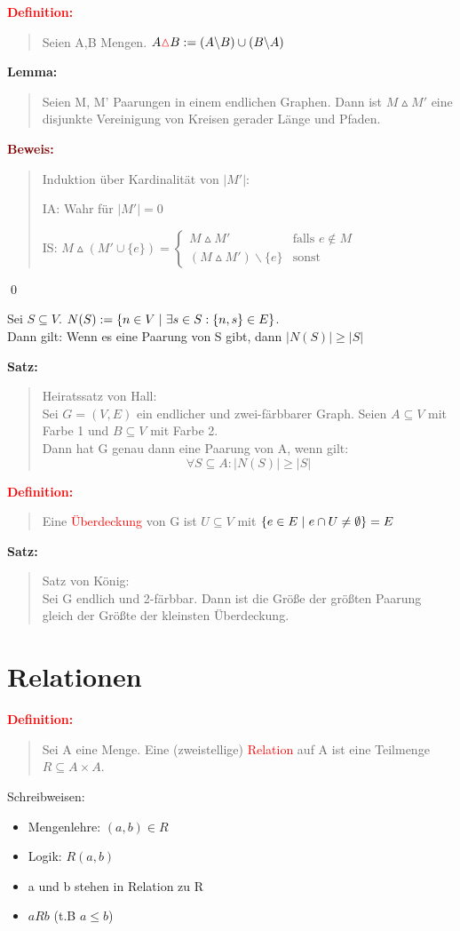 \documentclass{article}
\newcommand{\smsp}{\phantom{\hspace{3px}}}
\newcommand{\red}[1]{\textcolor{red}{#1}}
\newcommand{\dgr}[1]{\textcolor{dgr}{#1}}
\newcommand{\maroon}[1]{\textcolor{maroon}{#1}}
\newcommand{\de}[1]{\red{\textbf{Definition: }}\begin{quote}#1\end{quote}}
\newcommand{\se}[1]{\dgr{\textbf{Satz: }}\begin{quote}#1\end{quote}}
\newcommand{\lem}[1]{\dgr{\textbf{Lemma: }}\begin{quote}#1\end{quote}}
\newcommand{\pr}[1]{\maroon{\textbf{Beweis: }}\begin{quote}#1\end{quote}\qed}
\renewcommand{\st}{\smsp | \smsp}
\newcommand{\xor}{\mathbin{\vartriangle}}
\newcommand{\bs}{\backslash}
\begin{document}
\de{
    Seien A,B Mengen. $A \red{\xor} B := (A \bs B) \cup (B \bs A)$
}

\lem{
    Seien M, M' Paarungen in einem endlichen Graphen. Dann ist $M \xor M'$ eine disjunkte Vereinigung von Kreisen gerader Länge und Pfaden.
}
\pr{
    Induktion über Kardinalität von $|M'|$:

    IA: Wahr für $|M'| = 0$

    IS: $M \xor (M' \cup \{e\}) = \begin{cases}
        M \xor M' & \text{falls $e \notin M$}\\
        (M \xor M') \bs \{e\} & \text{sonst}
    \end{cases}$
}

Sei $S \subseteq V$. $N(S) := \{n \in V \st \exists s \in S: \{n,s\} \in E\}$.\\
Dann gilt: Wenn es eine Paarung von S gibt, dann $|N(S)| \ge |S|$

\se{
    Heiratssatz von Hall:\\
    Sei $G=(V,E)$ ein endlicher und zwei-färbbarer Graph. Seien $A \subseteq V$ mit Farbe 1 und $B \subseteq V$ mit Farbe 2.\\
    Dann hat G genau dann eine Paarung von A, wenn gilt:
    \[
        \forall S \subseteq A: |N(S)| \ge |S|   
    \]
}

\de{
    Eine \red{Überdeckung} von G ist $U \subseteq V$ mit $\{e \in E \st e \cap U \ne \emptyset\} = E$
}

\se{
    Satz von König:\\
    Sei G endlich und 2-färbbar. Dann ist die Größe der größten Paarung gleich der Größte der kleinsten Überdeckung.
}

\newpage
\section{Relationen}

\de{
    Sei A eine Menge. Eine (zweistellige) \red{Relation} auf A ist eine Teilmenge $R \subseteq A \times A$.
}

Schreibweisen:
\begin{itemize}
    \item Mengenlehre: $(a,b) \in R$
    \item Logik: $R(a,b)$
    \item a und b stehen in Relation zu R
    \item $aRb$ (t.B $a \le b$)
\end{itemize}
\end{document}
